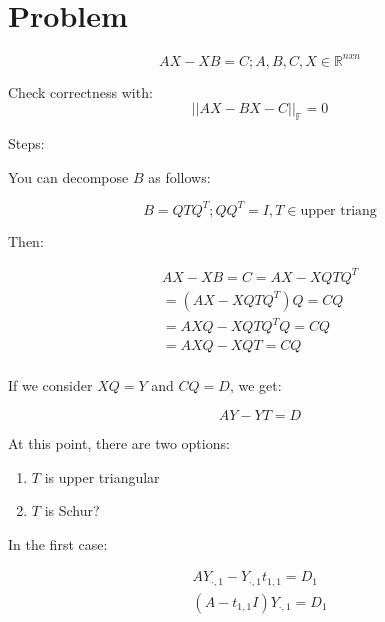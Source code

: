 \documentclass[]{article}
\title{}
\author{}
\begin{document}
\maketitle

\begin{abstract}

\end{abstract}

\section{Problem}

\begin{equation}
AX-XB = C; A,B,C,X \in \mathbb{R}^{nxn}
\end{equation}

Check correctness with:
\begin{equation}
||AX-BX - C||_{\mathbb{F}} = 0
\end{equation}

Steps:

You can decompose $B$ as follows:

\begin{equation}
B = QTQ^{T}; QQ^{T} = I, T \in \text{upper triang}
\end{equation}




Then:

\begin{gather}
AX-XB = C = AX-XQTQ^{T}\\ 
= (AX-XQTQ^{T})Q = CQ \\	
= AXQ-XQTQ^{T}Q = CQ \\
= AXQ-XQT= CQ \\
\end{gather}

If we consider $XQ = Y$ and $CQ = D$, we get:

\begin{equation}
AY-YT = D
\end{equation}

At this point, there are two options:

\begin{enumerate}
	\item $T$ is upper triangular
	\item $T$ is Schur?
\end{enumerate}

In the first case:

\begin{gather}
AY_{\cdot,1}-Y_{\cdot,1}t_{1,1} = D_1\\
(A-t_{1,1}I)Y_{\cdot,1} = D_1\\
\end{gather}
\end{document}
